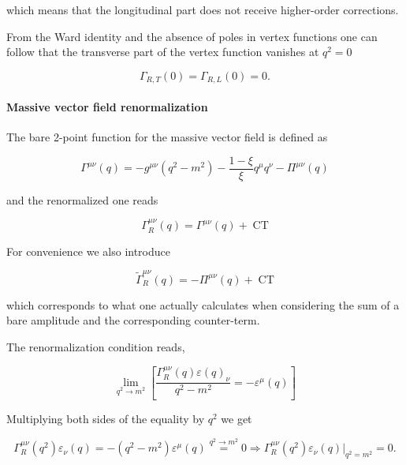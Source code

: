\documentclass[../FeynCalcManual.tex]{subfiles}
\begin{document}
which means that the longitudinal part does not receive higher-order
corrections.

From the Ward identity and the absence of poles in vertex functions one
can follow that the transverse part of the vertex function vanishes at
\(q^2=0\)

\begin{equation}
    \Gamma_{R,T} (0) = \Gamma_{R,L} (0) = 0.
\end{equation}

\paragraph{Massive vector field
renormalization}\label{massive-vector-field-renormalization}

The bare 2-point function for the massive vector field is defined as

\begin{equation}
    \Gamma^{\mu \nu} (q) = -g^{\mu \nu} (q^2 - m^2) - \frac{1-\xi}{\xi} q^{\mu} q^{\nu}  - \Pi^{\mu \nu} (q)
\end{equation}

and the renormalized one reads

\begin{equation}
    \Gamma_R^{\mu \nu} (q) = \Gamma^{\mu \nu} (q) + \;\text{CT}
\end{equation}

For convenience we also introduce

\begin{equation}
    \tilde{\Gamma}^{\mu \nu}_R(q) = - \Pi^{\mu \nu} (q) + \;\text{CT}
\end{equation}

which corresponds to what one actually calculates when considering the
sum of a bare amplitude and the corresponding counter-term.

The renormalization condition reads,

\begin{equation}
    \lim_{q^2 \to m^2} \left [ \frac{\Gamma_R^{\mu \nu} (q) \varepsilon(q)_\nu}{q^2 - m^2}  = - \varepsilon^{\mu}(q) \right ]
\end{equation}

Multiplying both sides of the equality by \(q^2\) we get

\begin{equation}
    \Gamma_R^{\mu \nu} (q^2)   \varepsilon_\nu (q) = - (q^2 - m^2) \varepsilon^{\mu}(q) \overset{q^2 \to m^2}{=} 0 \Rightarrow \Gamma_R^{\mu \nu} (q^2) \varepsilon_\nu(q) \biggl|_{q^2=m^2}  = 0.
\end{equation}
\end{document}
